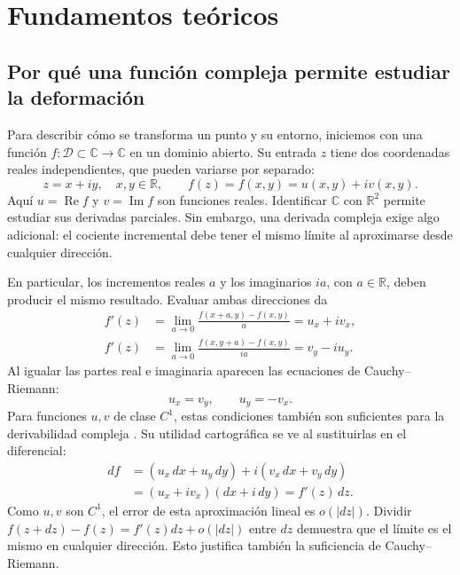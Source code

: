 \section{Fundamentos teóricos}
\subsection{Por qué una función compleja permite estudiar la deformación}
Para describir cómo se transforma un punto y su entorno, iniciemos con una función $f:\mathcal D\subset\mathbb C\to\mathbb C$ en un dominio abierto. Su entrada $z$ tiene dos coordenadas reales independientes, que pueden variarse por separado:
\begin{equation}
 z=x+iy,\quad x,y\in\mathbb R,\qquad
 f(z)=f(x,y)=u(x,y)+iv(x,y).
 \label{eq:real_complejo}
\end{equation}
Aquí $u=\operatorname{Re}f$ y $v=\operatorname{Im}f$ son funciones reales. Identificar $\mathbb C$ con $\mathbb R^2$ permite estudiar sus derivadas parciales. Sin embargo, una derivada compleja exige algo adicional: el cociente incremental debe tener el mismo límite al aproximarse desde cualquier dirección.

En particular, los incrementos reales $a$ y los imaginarios $ia$, con $a\in\mathbb R$, deben producir el mismo resultado. Evaluar ambas direcciones da
\begin{equation}
 \begin{aligned}
 f'(z)&=\lim_{a\to0}\frac{f(x+a,y)-f(x,y)}a=u_x+iv_x,\\
 f'(z)&=\lim_{a\to0}\frac{f(x,y+a)-f(x,y)}{ia}=v_y-iu_y.
 \end{aligned}\label{eq:derivadas_direcciones}
\end{equation}
Al igualar las partes real e imaginaria aparecen las ecuaciones de Cauchy--Riemann:
\begin{equation}
 u_x=v_y,\qquad u_y=-v_x.
 \label{eq:cr}
\end{equation}
Para funciones $u,v$ de clase $C^1$, estas condiciones también son suficientes para la derivabilidad compleja \cite{marsden1999,ahlfors1979}. Su utilidad cartográfica se ve al sustituirlas en el diferencial:
\begin{equation}
 \begin{aligned}
 df&=(u_x\,dx+u_y\,dy)+i(v_x\,dx+v_y\,dy)\\
   &=(u_x+iv_x)(dx+i\,dy)=f'(z)\,dz.
 \end{aligned}\label{eq:diferencial}
\end{equation}
Como $u,v$ son $C^1$, el error de esta aproximación lineal es $o(|dz|)$. Dividir $f(z+dz)-f(z)=f'(z)dz+o(|dz|)$ entre $dz$ demuestra que el límite es el mismo en cualquier dirección. Esto justifica también la suficiencia de Cauchy--Riemann.

